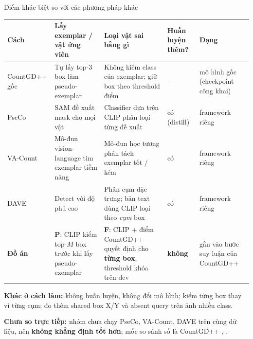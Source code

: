 \documentclass[aspectratio=169,10pt]{beamer}
\gdef\currentsource{}
\newcommand{\source}[1]{\gdef\currentsource{#1}}
\begin{document}
\begin{frame}{Điểm khác biệt so với các phương pháp khác}
\source{Huang và cs., CVPR 2024 (PseCo); Zhu và cs., ECCV 2024 (VA-Count); Pelhan và cs., CVPR 2024 (DAVE, mục 3.2--3.4); đối chiếu tóm tắt arXiv 25/11}
\scriptsize
\renewcommand{\arraystretch}{1.05}
\begin{tabularx}{\textwidth}{@{}>{\bfseries\raggedright\arraybackslash}p{} >{\raggedright\arraybackslash}X >{\raggedright\arraybackslash}X >{\centering\arraybackslash}p{} >{\raggedright\arraybackslash}p{}@{}}
\toprule
\normalfont\bfseries Cách & \textbf{Lấy exemplar / vật ứng viên} & \textbf{Loại vật sai bằng gì} & \textbf{Huấn luyện thêm?} & \textbf{Dạng}\\
\midrule
CountGD++ gốc & Tự lấy top-3 box làm pseudo-exemplar & Không kiểm class của exemplar; giữ box theo threshold điểm & -- & mô hình gốc (checkpoint công khai)\\
PseCo & SAM đề xuất mask cho mọi vật & Classifier dựa trên CLIP phân loại từng đề xuất & có (distill) & framework riêng\\
VA-Count & Mô-đun vision-language tìm exemplar tiềm năng & Mô-đun học tương phản tách exemplar tốt / kém & có & framework riêng\\
DAVE & Detect với độ phủ cao & Phân cụm đặc trưng; bản text dùng CLIP loại theo \emph{cụm} box & có & framework riêng\\
\midrule
\textbf{Đồ án} & \textbf{P}: CLIP kiểm top-$M$ box trước khi lấy pseudo-exemplar & \textbf{F}: CLIP + điểm CountGD++ quyết định cho \textbf{từng box}, threshold khóa trên dev & \textbf{không} & gắn vào bước suy luận của CountGD++\\
\bottomrule
\end{tabularx}
\vspace{1mm}
{\scriptsize\textbf{Khác ở cách làm:} không huấn luyện, không đổi mô hình; kiểm từng box thay vì từng cụm; đo thêm shared box X/Y và absent query trên ảnh nhiều class.\par}
\vspace{0.5mm}
{\scriptsize\textcolor{bad}{\textbf{Chưa so trực tiếp:}} nhóm chưa chạy PseCo, VA-Count, DAVE trên cùng dữ liệu, nên \textbf{không khẳng định tốt hơn}; mốc so sánh số là CountGD++ \Bzero, \Btwo.\par}
\end{frame}
\end{document}

